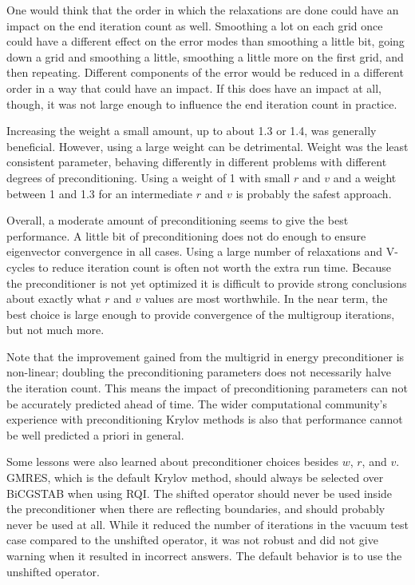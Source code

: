 One would think that the order in which the relaxations are done could have an impact on the end iteration count as well. Smoothing a lot on each grid once could have a different effect on the error modes than smoothing a little bit, going down a grid and smoothing a little, smoothing a little more on the first grid, and then repeating. Different components of the error would be reduced in a different order in a way that could have an impact. If this does have an impact at all, though, it was not large enough to influence the end iteration count in practice.  
 
Increasing the weight a small amount, up to about 1.3 or 1.4, was generally beneficial. However, using a large weight can be detrimental. Weight was the least consistent parameter, behaving differently in different problems with different degrees of preconditioning. Using a weight of 1 with small $r$ and $v$ and a weight between 1 and 1.3 for an intermediate $r$ and $v$ is probably the safest approach. 

Overall, a moderate amount of preconditioning seems to give the best performance. A little bit of preconditioning does not do enough to ensure eigenvector convergence in all cases. Using a large number of relaxations and V-cycles to reduce iteration count is often not worth the extra run time. Because the preconditioner is not yet optimized it is difficult to provide strong conclusions about exactly what $r$ and $v$ values are most worthwhile. In the near term, the best choice is large enough to provide convergence of the multigroup iterations, but not much more.

Note that the improvement gained from the multigrid in energy preconditioner is non-linear; doubling the preconditioning parameters does not necessarily halve the iteration count. This means the impact of preconditioning parameters can not be accurately predicted ahead of time. The wider computational community's experience with preconditioning Krylov methods is also that performance cannot be well predicted a priori in general.

Some lessons were also learned about preconditioner choices besides $w$, $r$, and $v$. GMRES, which is the default Krylov method, should always be selected over BiCGSTAB when using RQI. The shifted operator should never be used inside the preconditioner when there are reflecting boundaries, and should probably never be used at all. While it reduced the number of iterations in the vacuum test case compared to the unshifted operator, it was not robust and did not give warning when it resulted in incorrect answers. The default behavior is to use the unshifted operator. 

